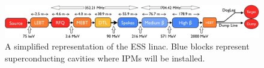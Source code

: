 \begin{figure}[!ht]
	\begin{center}
		\includegraphics[width=\textwidth]{02_BeamDiag/figures/fig000_ESS_acc}
	\end{center}
	\caption[A simplified representation of the ESS linac]{A simplified representation of the ESS linac. Blue blocks represent superconducting cavities where IPMs will be installed.}
	\label{chap2:fig:ESS_acc}
\end{figure}
